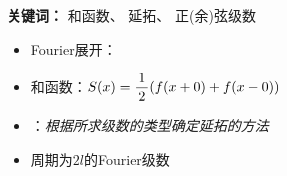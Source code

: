 \begin{frame}
	\linespread{1.2}
	
	{\b{\bf 关键词：} 和函数、 延拓、 正(余)弦级数} 
	\begin{itemize}
	  \item Fourier展开： 
	  \item 和函数：$S(x)=\displaystyle\frac{\,{1}\,}{\,{2}\,}(f(x+0)+f(x-0))$
	  {\color{yellow!90!gray}\mbox{\FiveStar}}
	  \item {}：{\it 根据所求级数的类型确定延拓的方法}
	  \item 周期为$2l$的Fourier级数
	\end{itemize}
\end{frame}

% 


% 
